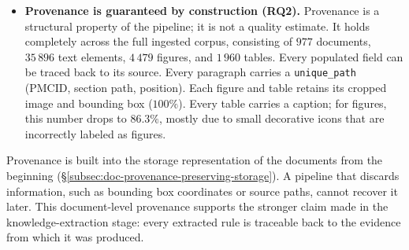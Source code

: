 \begin{itemize}[label={},leftmargin=1.5em]
    \item \textbf{Provenance is guaranteed by construction (RQ2).} Provenance is a structural property of the pipeline; it is not a quality estimate. It holds completely across the full ingested corpus, consisting of $977$ documents, $35\,896$ text elements, $4\,479$ figures, and $1\,960$ tables. Every populated field can be traced back to its source. Every paragraph carries a \texttt{unique\_path} (PMCID, section path, position). Each figure and table retains its cropped image and bounding box ($100\%$). Every table carries a caption; for figures, this number drops to $86.3\%$, mostly due to small decorative icons that are incorrectly labeled as figures. 

\end{itemize}

Provenance is built into the storage representation of the documents from the beginning (§\ref{subsec:doc-provenance-preserving-storage}). A pipeline that discards information, such as bounding box coordinates or source paths, cannot recover it later. This document-level provenance supports the stronger claim made in the knowledge-extraction stage: every extracted rule is traceable back to the evidence from which it was produced.